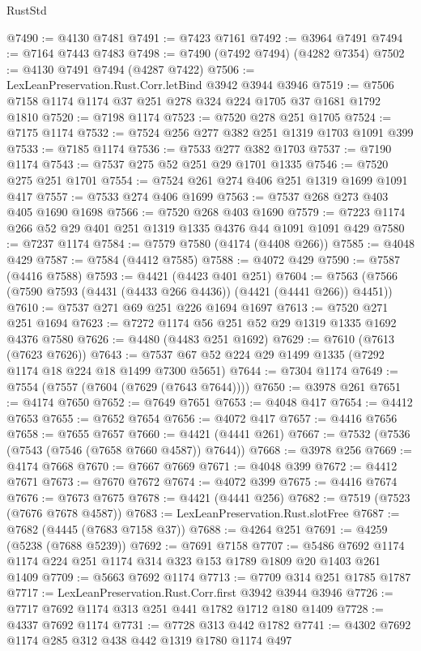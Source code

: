\begin{lexlean}{RustStd}
\begin{coremodule}
@7490 := @4130 @7481
@7491 := @7423 @7161
@7492 := @3964 @7491
@7494 := @7164 @7443 @7483
@7498 := @7490 (@7492 @7494) (@4282 @7354)
@7502 := @4130 @7491 @7494 (@4287 @7422)
@7506 := LexLeanPreservation.Rust.Corr.letBind @3942 @3944 @3946
@7519 := @7506 @7158 @1174 @1174 @37 @251 @278 @324 @224 @1705 @37 @1681 @1792 @1810
@7520 := @7198 @1174
@7523 := @7520 @278 @251 @1705
@7524 := @7175 @1174
@7532 := @7524 @256 @277 @382 @251 @1319 @1703 @1091 @399
@7533 := @7185 @1174
@7536 := @7533 @277 @382 @1703
@7537 := @7190 @1174
@7543 := @7537 @275 @52 @251 @29 @1701 @1335
@7546 := @7520 @275 @251 @1701
@7554 := @7524 @261 @274 @406 @251 @1319 @1699 @1091 @417
@7557 := @7533 @274 @406 @1699
@7563 := @7537 @268 @273 @403 @405 @1690 @1698
@7566 := @7520 @268 @403 @1690
@7579 := @7223 @1174 @266 @52 @29 @401 @251 @1319 @1335 @4376 @44 @1091 @1091 @429
@7580 := @7237 @1174
@7584 := @7579 @7580 (@4174 (@4408 @266))
@7585 := @4048 @429
@7587 := @7584 (@4412 @7585)
@7588 := @4072 @429
@7590 := @7587 (@4416 @7588)
@7593 := @4421 (@4423 @401 @251)
@7604 := @7563 (@7566 (@7590 @7593 (@4431 (@4433 @266 @4436)) (@4421 (@4441 @266)) @4451))
@7610 := @7537 @271 @69 @251 @226 @1694 @1697
@7613 := @7520 @271 @251 @1694
@7623 := @7272 @1174 @56 @251 @52 @29 @1319 @1335 @1692 @4376 @7580
@7626 := @4480 (@4483 @251 @1692)
@7629 := @7610 (@7613 (@7623 @7626))
@7643 := @7537 @67 @52 @224 @29 @1499 @1335 (@7292 @1174 @18 @224 @18 @1499 @7300 @5651)
@7644 := @7304 @1174
@7649 := @7554 (@7557 (@7604 (@7629 (@7643 @7644))))
@7650 := @3978 @261
@7651 := @4174 @7650
@7652 := @7649 @7651
@7653 := @4048 @417
@7654 := @4412 @7653
@7655 := @7652 @7654
@7656 := @4072 @417
@7657 := @4416 @7656
@7658 := @7655 @7657
@7660 := @4421 (@4441 @261)
@7667 := @7532 (@7536 (@7543 (@7546 (@7658 @7660 @4587)) @7644))
@7668 := @3978 @256
@7669 := @4174 @7668
@7670 := @7667 @7669
@7671 := @4048 @399
@7672 := @4412 @7671
@7673 := @7670 @7672
@7674 := @4072 @399
@7675 := @4416 @7674
@7676 := @7673 @7675
@7678 := @4421 (@4441 @256)
@7682 := @7519 (@7523 (@7676 @7678 @4587))
@7683 := LexLeanPreservation.Rust.slotFree
@7687 := @7682 (@4445 (@7683 @7158 @37))
@7688 := @4264 @251
@7691 := @4259 (@5238 (@7688 @5239))
@7692 := @7691 @7158
@7707 := @5486 @7692 @1174 @1174 @224 @251 @1174 @314 @323 @153 @1789 @1809 @20 @1403 @261 @1409
@7709 := @5663 @7692 @1174
@7713 := @7709 @314 @251 @1785 @1787
@7717 := LexLeanPreservation.Rust.Corr.first @3942 @3944 @3946
@7726 := @7717 @7692 @1174 @313 @251 @441 @1782 @1712 @180 @1409
@7728 := @4337 @7692 @1174
@7731 := @7728 @313 @442 @1782
@7741 := @4302 @7692 @1174 @285 @312 @438 @442 @1319 @1780 @1174 @497

\end{coremodule}
\end{lexlean}
